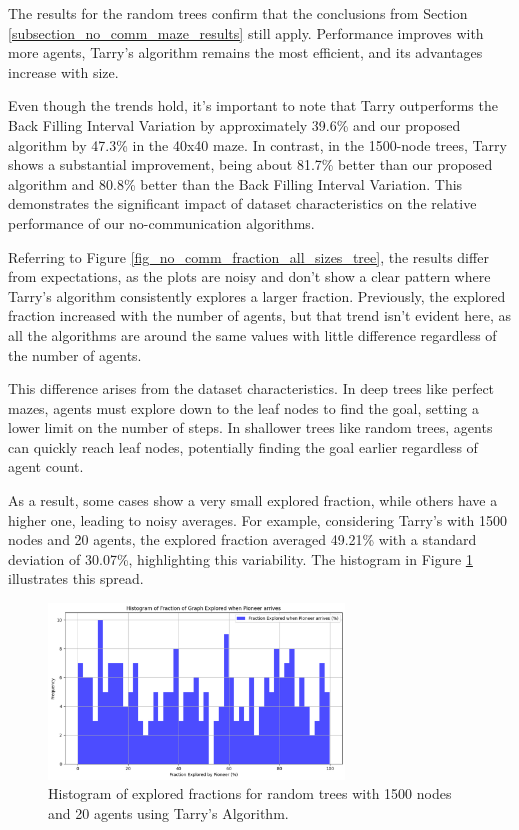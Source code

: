 The results for the random trees confirm that the conclusions from Section \ref{subsection_no_comm_maze_results} still apply. Performance improves with more agents, Tarry's algorithm remains the most efficient, and its advantages increase with size.

Even though the trends hold, it's important to note that Tarry outperforms the Back Filling Interval Variation by approximately 39.6\% and our proposed algorithm by 47.3\% in the 40x40 maze. In contrast, in the 1500-node trees, Tarry shows a substantial improvement, being about 81.7\% better than our proposed algorithm and 80.8\% better than the Back Filling Interval Variation. This demonstrates the significant impact of dataset characteristics on the relative performance of our no-communication algorithms.

Referring to Figure \ref{fig_no_comm_fraction_all_sizes_tree}, the results differ from expectations, as the plots are noisy and don't show a clear pattern where Tarry's algorithm consistently explores a larger fraction. Previously, the explored fraction increased with the number of agents, but that trend isn't evident here, as all the algorithms are around the same values with little difference regardless of the number of agents.

This difference arises from the dataset characteristics. In deep trees like perfect mazes, agents must explore down to the leaf nodes to find the goal, setting a lower limit on the number of steps. In shallower trees like random trees, agents can quickly reach leaf nodes, potentially finding the goal earlier regardless of agent count.

As a result, some cases show a very small explored fraction, while others have a higher one, leading to noisy averages. For example, considering Tarry's with 1500 nodes and 20 agents, the explored fraction averaged 49.21\% with a standard deviation of 30.07\%, highlighting this variability. The histogram in Figure \ref{fig_no_comm_fraction_histogram_tree} illustrates this spread.

\begin{figure}[H]
    \centering 
    \includegraphics[width=0.7\textwidth]{Cap3/no_comm_fraction_histogram_tree.pdf} 
    \caption{Histogram of explored fractions for random trees with 1500 nodes and 20 agents using Tarry's Algorithm.} 
    \label{fig_no_comm_fraction_histogram_tree}
\end{figure}

